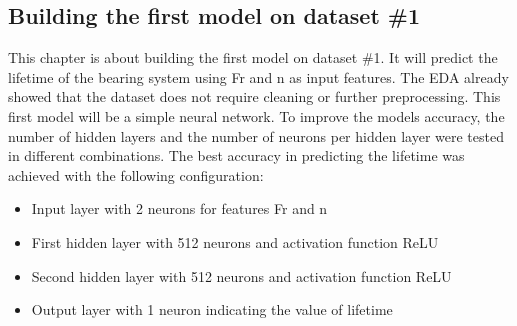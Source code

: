 \documentclass[letterpaper,10pt]{article}
\begin{document}
	
	
	
	
	
	
	
	
	
	
	
	
	
	
	\subsection{Building the first model on dataset \#1}
	This chapter is about building the first model on dataset \#1. It will predict the lifetime of the bearing system using Fr and n as input features. The EDA already showed that the dataset does not require cleaning or further preprocessing.
	\newline This first model will be a simple neural network. To improve the models accuracy, the number of hidden layers and the number of neurons per hidden layer were tested in different combinations. The best accuracy in predicting the lifetime was achieved with the following configuration: 
	\begin{itemize}
		\item Input layer with 2 neurons for features Fr and n
		\item First hidden layer with 512 neurons and activation function ReLU
		\item Second hidden layer with 512 neurons and activation function ReLU
		\item Output layer with 1 neuron indicating the value of lifetime
	\end{itemize}
	
	
	
	
	
	
	
	
	
	
	
	
	
	
	
	
	
	
	
	
	
	
	
	
	
	
	
	
	
\end{document}
